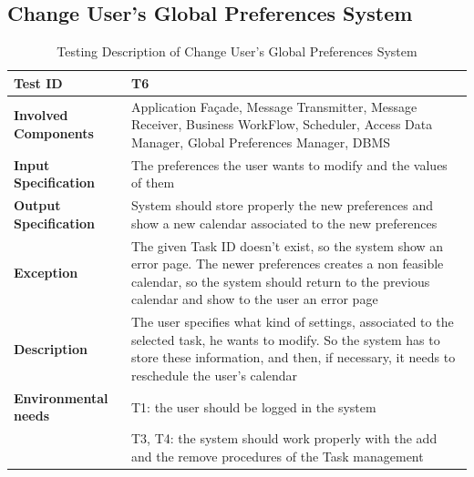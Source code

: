 \subsection*{Change User's Global Preferences System}

\begin{table}[H]
    \centering
    \begin{tabular}{p{4.55cm} p{7cm}}
        
        \hline
        
        \textbf{Test ID}                & T6 \\
        
        \hline
        
        \textbf{Involved Components}    & Application Façade, Message Transmitter, Message Receiver, Business                                          WorkFlow, Scheduler, Access Data Manager, Global Preferences Manager,                                      DBMS\\
        
        \hline
        
        \textbf{Input Specification}    & The preferences the user wants to modify and the values of them\\
        
        \hline
        
        \textbf{Output Specification}   & System should store properly the new preferences and show a new calendar associated to the new preferences\\
        
        \hline
        
        \textbf{Exception}              & The given Task ID doesn't exist, so the system show an error page. The newer preferences creates a non feasible calendar, so the system should return to the previous calendar and show to the user an error page\\
        
        \hline
        
        \textbf{Description}            & The user specifies what kind of settings, associated to the selected task, he wants to modify. So the system has to store these information, and then, if necessary, it needs to reschedule the user's calendar\\
        \hline
        
        \textbf{Environmental needs}    & T1: the user should be logged in the system\\
                                        & T3, T4: the system should work properly with the add and the remove procedures of the Task management \\
        
        \hline
        
    \end{tabular}
    \caption{Testing Description of Change User's Global Preferences System}
    
\end{table}





